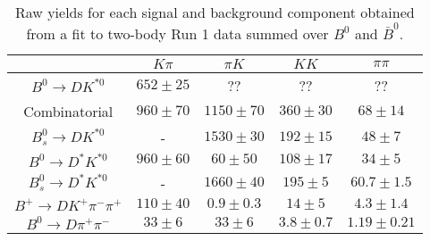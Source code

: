 \begin{table}
  \centering
  \begin{tabular}{ccccc}
      \toprule
       & $K\pi$ & $\pi K$ & $KK$ & $\pi\pi$ \\
      \midrule
      $B^0 \to DK^{*0}$ & $652 \pm 25$ & ?? & ?? & ?? \\
      Combinatorial & $960 \pm 70$ & $1150 \pm 70$ & $360 \pm 30$ & $68 \pm 14$ \\
      $B^0_s \to DK^{*0}$ & \-- & $1530 \pm 30$ & $192 \pm 15$ & $48 \pm 7$ \\
      $B^0 \to D^*K^{*0}$ & $960 \pm 60$ & $60 \pm 50$ & $108 \pm 17$ & $34 \pm 5$ \\
      $B^0_s \to D^*K^{*0}$ & \-- & $1660 \pm 40$ & $195 \pm 5$ & $60.7 \pm 1.5$ \\
      $B^+ \to DK^+\pi^-\pi^+$ & $110 \pm 40$ & $0.9 \pm 0.3$ & $14 \pm 5$ & $4.3 \pm 1.4$ \\
      $B^0 \to D\pi^+\pi^-$ & $33 \pm 6$ & $33 \pm 6$ & $3.8 \pm 0.7$ & $1.19 \pm 0.21$ \\
      \bottomrule
      \end{tabular}
  \caption{Raw yields for each signal and background component obtained from a fit to two-body Run 1 data summed over $B^0$ and $\bar{B}^0$.}
\label{tab:yields_combined_2body_run1}
\end{table}

